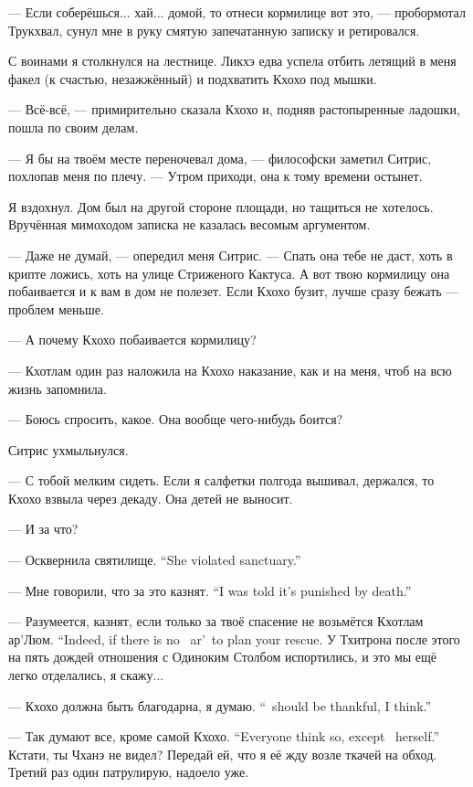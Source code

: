 --- Если соберёшься... хай... домой, то отнеси кормилице вот это, --- пробормотал Трукхвал, сунул мне в руку смятую запечатанную записку и ретировался.

С воинами я столкнулся на лестнице.
Ликхэ едва успела отбить летящий в меня факел (к счастью, незажжённый) и подхватить Кхохо под мышки.

--- Всё-всё, --- примирительно сказала Кхохо и, подняв растопыренные ладошки, пошла по своим делам.

--- Я бы на твоём месте переночевал дома, --- философски заметил Ситрис, похлопав меня по плечу.
--- Утром приходи, она к тому времени остынет.

Я вздохнул.
Дом был на другой стороне площади, но тащиться не хотелось.
Вручённая мимоходом записка не казалась весомым аргументом.

--- Даже не думай, --- опередил меня Ситрис.
--- Спать она тебе не даст, хоть в крипте ложись, хоть на улице Стриженого Кактуса.
А вот твою кормилицу она побаивается и к вам в дом не полезет.
Если Кхохо бузит, лучше сразу бежать --- проблем меньше.

--- А почему Кхохо побаивается кормилицу?

--- Кхотлам один раз наложила на Кхохо наказание, как и на меня, чтоб на всю жизнь запомнила.

--- Боюсь спросить, какое.
Она вообще чего-нибудь боится?

Ситрис ухмыльнулся.

--- С тобой мелким сидеть.
Если я салфетки полгода вышивал, держался, то Кхохо взвыла через декаду.
Она детей не выносит.

--- И за что?

{--- Осквернила святилище.}
{``She violated sanctuary.''}

{--- Мне говорили, что за это казнят.}
{``I was told it's punished by death.''}

{--- Разумеется, казнят, если только за твоё спасение не возьмётся Кхотлам ар'Люм.}
{``Indeed, if there is no \Kchotlam\ ar'\Loem\ to plan your rescue.}
У Тхитрона после этого на пять дождей отношения с Одиноким Столбом испортились, и это мы ещё легко отделались, я скажу...

{--- Кхохо должна быть благодарна, я думаю.}
{``\Kchoho\ should be thankful, I think.''}

{--- Так думают все, кроме самой Кхохо.}
{``Everyone think so, except \Kchoho\ herself.''}
Кстати, ты Чханэ не видел?
Передай ей, что я её жду возле ткачей на обход.
Третий раз один патрулирую, надоело уже.

